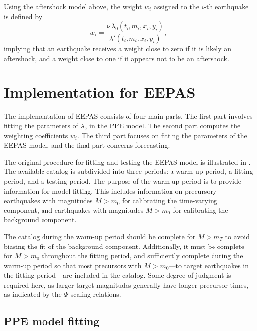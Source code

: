 \documentclass[linenum,doublespace,onecolumn]{SSA-SRL}
\theoremstyle{lemma}
\begin{document}
Using the aftershock model above, the weight $w_i$ assigned to the $i$-th earthquake is defined by
\begin{equation}\label{wi}
    w_i = \frac{\nu\, \lambda_0(t_i, m_i, x_i, y_i)}{\lambda'(t_i, m_i, x_i, y_i)},
\end{equation}
implying that an earthquake receives a weight close to zero if it is likely an aftershock, and a weight close to one if it appears not to be an aftershock.


\section{Implementation for EEPAS}

The implementation of EEPAS consists of four main parts. The first part involves fitting the parameters of $\lambda_0$ in the PPE model. The second part computes the weighting coefficients $w_i$. The third part focuses on fitting the parameters of the EEPAS model, and the final part concerns forecasting.

The original procedure for fitting and testing the EEPAS model is illustrated in . The available catalog is subdivided into three periods: a warm-up period, a fitting period, and a testing period. The purpose of the warm-up period is to provide information for model fitting. This includes information on precursory earthquakes with magnitudes $M > m_0$ for calibrating the time-varying component, and earthquakes with magnitudes $M > m_T$ for calibrating the background component. 

The catalog during the warm-up period should be complete for $M > m_T$ to avoid biasing the fit of the background component. Additionally, it must be complete for $M > m_0$ throughout the fitting period, and sufficiently complete during the warm-up period so that most precursors with $M > m_0$—to target earthquakes in the fitting period—are included in the catalog. Some degree of judgment is required here, as larger target magnitudes generally have longer precursor times, as indicated by the $\Psi$ scaling relations.

\subsection{PPE model fitting}
\end{document}
